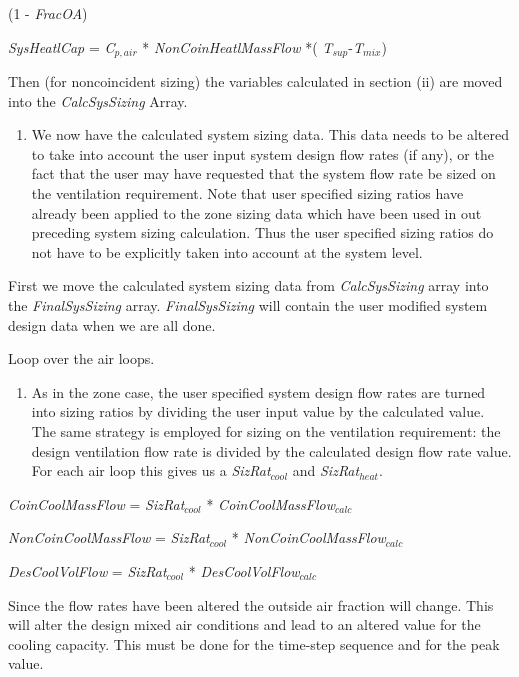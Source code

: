 (1 - \emph{FracOA})

\emph{SysHeatlCap} = \emph{C\(_{p,air}\)} * \emph{NonCoinHeatlMassFlow} *( \emph{T\(_{sup}\)}-\emph{T\(_{mix}\)})

Then (for noncoincident sizing) the variables calculated in section (ii) are moved into the \emph{CalcSysSizing} Array.

\begin{enumerate}
\def\labelenumi{(\arabic{enumi})}
\setcounter{enumi}{1}
\tightlist
\item
  We now have the calculated system sizing data. This data needs to be altered to take into account the user input system design flow rates (if any), or the fact that the user may have requested that the system flow rate be sized on the ventilation requirement. Note that user specified sizing ratios have already been applied to the zone sizing data which have been used in out preceding system sizing calculation. Thus the user specified sizing ratios do not have to be explicitly taken into account at the system level.
\end{enumerate}

First we move the calculated system sizing data from \emph{CalcSysSizing} array into the \emph{FinalSysSizing} array. \emph{FinalSysSizing} will contain the user modified system design data when we are all done.

Loop over the air loops.

\begin{enumerate}
\def\labelenumi{(\roman{enumi})}
\tightlist
\setlength\itemindent{25pt} \item As in the zone case, the user specified system design flow rates are turned into sizing ratios by dividing the user input value by the calculated value. The same strategy is employed for sizing on the ventilation requirement: the design ventilation flow rate is divided by the calculated design flow rate value. For each air loop this gives us a \emph{SizRat\(_{cool}\)} and \emph{SizRat\(_{heat}\)}.
\end{enumerate}

\emph{CoinCoolMassFlow} = \emph{SizRat\(_{cool}\)} * \emph{CoinCoolMassFlow\(_{calc}\)}

\emph{NonCoinCoolMassFlow} = \emph{SizRat\(_{cool}\)} * \emph{NonCoinCoolMassFlow\(_{calc}\)}

\emph{DesCoolVolFlow} = \emph{SizRat\(_{cool}\)} * \emph{DesCoolVolFlow\(_{calc}\)}

Since the flow rates have been altered the outside air fraction will change. This will alter the design mixed air conditions and lead to an altered value for the cooling capacity. This must be done for the time-step sequence and for the peak value.

